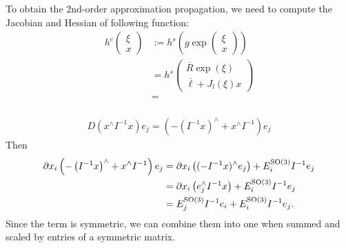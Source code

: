 \documentclass[12pt,class=article,crop=false]{standalone}
\begin{document}
To obtain the 2nd-order approximation propagation, we need to compute the Jacobian and Hessian of following function:
\begin{align*}
	h^c \begin{pmatrix} \xi \\ x \end{pmatrix} &:= h^s \left( g \exp \begin{pmatrix} \xi \\ x \end{pmatrix}  \right) \\
						   & = h^s \begin{pmatrix} \overline{R} \exp(\xi) \\ \overline{ \ell} + J_l(\xi)x \end{pmatrix}  \\
						   &=  \\
\end{align*}




\begin{align*}
	D( x^\wedge I^{-1} x) e_j = \left(-\left( I^{-1} x \right)^\wedge  + x^\wedge I^{-1} \right) e_j
\end{align*}
Then
\begin{align*}
	\partial x_i \left(-\left( I^{-1} x \right)^\wedge  + x^\wedge I^{-1} \right) e_j &= \partial x_i \left( (-I^{-1} x)^\wedge e_j \right) + E_i^{\operatorname{SO}(3)} I^{-1} e_j \\
	&= \partial x_i \left( e_j^\wedge I^{-1}x \right) + E_i^{\operatorname{SO}(3)} I^{-1} e_j\\
	&= E_j^{\operatorname{SO}(3)} I^{-1} e_i +  E_i^{\operatorname{SO}(3)} I^{-1} e_j .
\end{align*}
Since the term is symmetric, we can combine them into one when summed and scaled by entries of a symmetric matrix.
\end{document}
